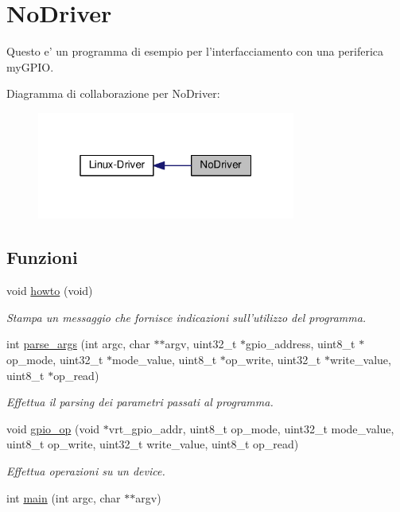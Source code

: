 \hypertarget{group___no_driver}{\section{No\+Driver}
\label{group___no_driver}
}


Questo e' un programma di esempio per l'interfacciamento con una periferica my\+G\+P\+I\+O.  


Diagramma di collaborazione per No\+Driver\+:\nopagebreak
\begin{figure}[H]
\begin{center}
\leavevmode
\includegraphics[width=241pt]{group___no_driver}
\end{center}
\end{figure}
\subsection*{Funzioni}
\begin{DoxyCompactItemize}
\item 
void \hyperlink{group___no_driver_ga05909651fa170a63e98e3f8e13451b7b}{howto} (void)
\begin{DoxyCompactList}\small\item\em Stampa un messaggio che fornisce indicazioni sull'utilizzo del programma. \end{DoxyCompactList}\item 
int \hyperlink{group___no_driver_ga218f8a9dfc36572bfe2230c5e2d2c776}{parse\+\_\+args} (int argc, char $\ast$$\ast$argv, uint32\+\_\+t $\ast$gpio\+\_\+address, uint8\+\_\+t $\ast$op\+\_\+mode, uint32\+\_\+t $\ast$mode\+\_\+value, uint8\+\_\+t $\ast$op\+\_\+write, uint32\+\_\+t $\ast$write\+\_\+value, uint8\+\_\+t $\ast$op\+\_\+read)
\begin{DoxyCompactList}\small\item\em Effettua il parsing dei parametri passati al programma. \end{DoxyCompactList}\item 
void \hyperlink{group___no_driver_ga879d8b839631449ecb5bc4d0721432b6}{gpio\+\_\+op} (void $\ast$vrt\+\_\+gpio\+\_\+addr, uint8\+\_\+t op\+\_\+mode, uint32\+\_\+t mode\+\_\+value, uint8\+\_\+t op\+\_\+write, uint32\+\_\+t write\+\_\+value, uint8\+\_\+t op\+\_\+read)
\begin{DoxyCompactList}\small\item\em Effettua operazioni su un device. \end{DoxyCompactList}\item 
int \hyperlink{group___no_driver_ga3c04138a5bfe5d72780bb7e82a18e627}{main} (int argc, char $\ast$$\ast$argv)
\end{DoxyCompactItemize}


